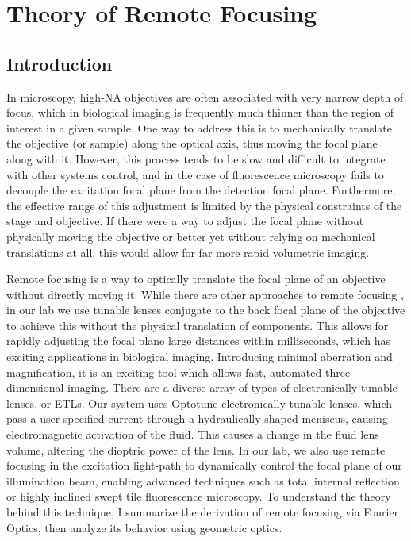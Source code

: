 \maketitle
\section{Theory of Remote Focusing}
\subsection{Introduction}
In microscopy, high-NA objectives are often associated with very narrow depth of focus, which in biological imaging is frequently much thinner than the region of interest in a given sample. One way to address this is to mechanically translate the objective (or sample) along the optical axis, thus moving the focal plane along with it. However, this process tends to be slow and difficult to integrate with other systems control, and in the case of fluorescence microscopy fails to decouple the excitation focal plane from the detection focal plane. Furthermore, the effective range of this adjustment is limited by the physical constraints of the stage and objective. If there were a way to adjust the focal plane without physically moving the objective or better yet without relying on mechanical translations at all, this would allow for far more rapid volumetric imaging.\par 
Remote focusing is a way to optically translate the focal plane of an objective without directly moving it. While there are other approaches to remote focusing \cite{Wilson}, in our lab we use tunable lenses conjugate to the back focal plane of the objective to achieve this without the physical translation of components. \cite{Hobson} This allows for rapidly adjusting the focal plane large distances within milliseconds, which has exciting applications in biological imaging. \cite{Annibale}  Introducing minimal aberration and magnification, it is an exciting tool which allows fast, automated three dimensional imaging. There are a diverse array of types of electronically tunable lenses, or ETLs. Our system uses Optotune electronically tunable lenses, which pass a user-specified current through a hydraulically-shaped meniscus, causing electromagnetic activation of the fluid. This causes a change in the fluid lens volume, altering the dioptric power of the lens. \cite{Chen} In our lab, we also use remote focusing in the excitation light-path to dynamically control the focal plane of our illumination beam, enabling advanced techniques such as total internal reflection or highly inclined swept tile fluorescence microscopy. To understand the theory behind this technique, I summarize the derivation of remote focusing via Fourier Optics, then analyze its behavior using geometric optics.

